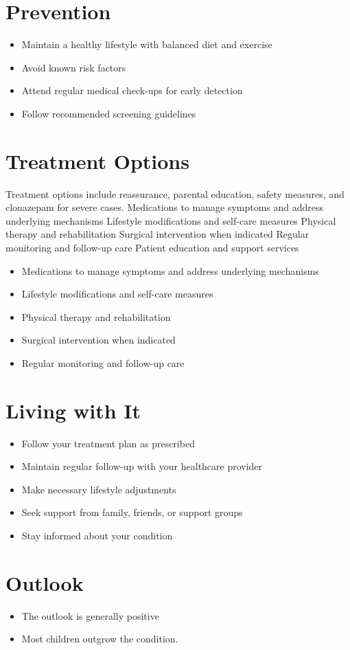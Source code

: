 \section{Prevention}
\begin{itemize}[noitemsep]
  \item Maintain a healthy lifestyle with balanced diet and exercise
  \item Avoid known risk factors
  \item Attend regular medical check-ups for early detection
  \item Follow recommended screening guidelines
\end{itemize}
\section{Treatment Options}
Treatment options include reassurance, parental education, safety measures, and clonazepam for severe cases. Medications to manage symptoms and address underlying mechanisms Lifestyle modifications and self-care measures Physical therapy and rehabilitation Surgical intervention when indicated Regular monitoring and follow-up care Patient education and support services

\begin{itemize}[noitemsep]
  \item Medications to manage symptoms and address underlying mechanisms
  \item Lifestyle modifications and self-care measures
  \item Physical therapy and rehabilitation
  \item Surgical intervention when indicated
  \item Regular monitoring and follow-up care
\end{itemize}
\section{Living with It}
\begin{itemize}[noitemsep]
  \item Follow your treatment plan as prescribed
  \item Maintain regular follow-up with your healthcare provider
  \item Make necessary lifestyle adjustments
  \item Seek support from family, friends, or support groups
  \item Stay informed about your condition
\end{itemize}
\section{Outlook}
\begin{itemize}[noitemsep]
  \item The outlook is generally positive
  \item Most children outgrow the condition.
\end{itemize}

